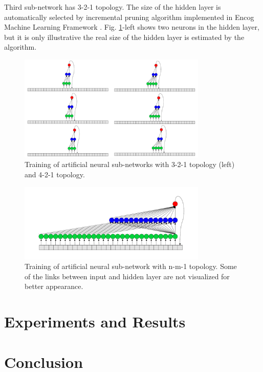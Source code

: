 \documentclass[11pt]{article}
\begin{document}
Third sub-network has 3-2-1 topology. The size of the hidden layer is automatically selected by incremental pruning algorithm implemented in Encog Machine Learning Framework \cite{heaton01}. Fig. \ref{fig:pic02}-left shows two neurons in the hidden layer, but it is only illustrative the real size of the hidden layer is estimated by the algorithm. 

\begin{figure}[ht!]
   \centering
     \includegraphics[width=0.8\textwidth]{pic02}
    \caption {Training of artificial neural sub-networks with 3-2-1 topology (left) and 4-2-1 topology.}
\label{fig:pic02}
\end{figure}
\FloatBarrier

\begin{figure}[ht!]
   \centering
     \includegraphics[width=0.8\textwidth]{pic03}
    \caption {Training of artificial neural sub-network with n-m-1 topology. Some of the links between input and hidden layer are not visualized for better appearance.}
\label{fig:pic03}
\end{figure}
\FloatBarrier

\section{Experiments and Results} \label{Experiments and Results}

\section{Conclusion} \label{Conclusion}
\end{document}
